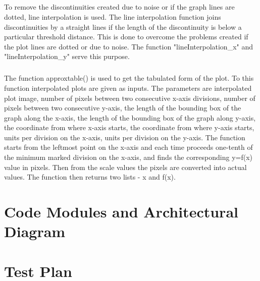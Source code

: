 \documentclass[12pts]{scrreprt}
\begin{document}
\paragraph{}
To remove the discontinuities created due to noise or if the graph lines are dotted, line interpolation is used. The line interpolation function joins discontinuities by a straight lines if the length of the discontinuity is below a particular threshold distance. This is done to overcome the problems created if the plot lines are dotted or due to noise. The  function "lineInterpolation_x" and "lineInterpolation_y" serve this purpose.
\paragraph{}
The function approxtable() is used to get the tabulated form of the plot. To this function interpolated plots are given as inputs. The parameters are interpolated plot image, number of pixels between two consecutive x-axis divisions, number of pixels between two consecutive y-axis, the length of the bounding box of the graph along the x-axis, the length of the bounding box of the graph along y-axis, the coordinate from where x-axis starts, the coordinate from where y-axis starts, units per division on the x-axis, units per division on the y-axis.
The function starts from the leftmost point on the x-axis and each time proceeds one-tenth of the minimum marked division on the x-axis, and finds the corresponding y=f(x) value in pixels. Then from the scale values the pixels are converted into actual values. The function then returns two lists - x and f(x).
  
\chapter{Code Modules and Architectural Diagram}

\chapter{Test Plan}
\end{document}
